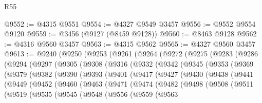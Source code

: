\begin{lexlean}{R55}
\begin{coremodule}
@9552 := @4315 @9551
@9554 := @4327 @9549 @3457
@9556 := @9552 @9554 @9120
@9559 := @3456 (@9127 (@8459 @9128))
@9560 := @8463 @9128
@9562 := @4316 @9560 @3457
@9563 := @4315 @9562
@9565 := @4327 @9560 @3457
@9613 := @9240
    (@9250
      (@9253
        (@9261
          (@9264
            (@9272
              (@9275
                (@9283
                  (@9286
                    (@9294
                      (@9297
                        (@9305
                          (@9308
                            (@9316
                              (@9332
                                (@9342
                                  (@9345
                                    (@9353
                                      (@9369
                                        (@9379
                                          (@9382
                                            (@9390
                                              (@9393
                                                (@9401
                                                  (@9417
                                                    (@9427
                                                      (@9430
                                                        (@9438
                                                          (@9441
                                                            (@9449
                                                              (@9452
                                                                (@9460
                                                                  (@9463
                                                                    (@9471
                                                                      (@9474
                                                                        (@9482
                                                                          (@9498
                                                                            (@9508
                                                                              (@9511
                                                                                (@9519
                                                                                  (@9535
                                                                                    (@9545
                                                                                      (@9548
                                                                                        (@9556
                                                                                          (@9559
                                                                                            (@9563

\end{coremodule}
\end{lexlean}
